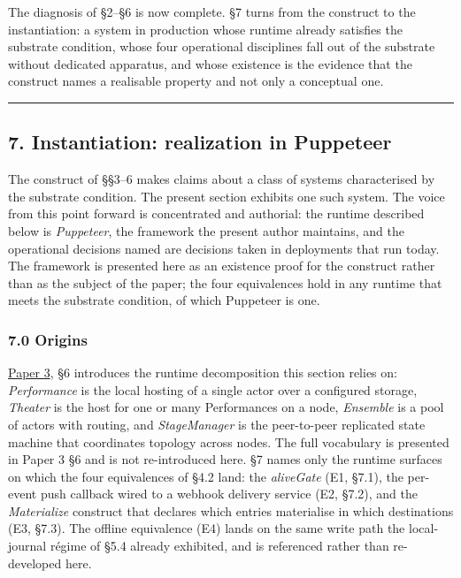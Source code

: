 \documentclass[
]{article}
\begin{document}
The diagnosis of §2--§6 is now complete. §7 turns from the construct to
the instantiation: a system in production whose runtime already
satisfies the substrate condition, whose four operational disciplines
fall out of the substrate without dedicated apparatus, and whose
existence is the evidence that the construct names a realisable property
and not only a conceptual one.

\begin{center}\rule{0.5\linewidth}{0.5pt}\end{center}

\subsection{7. Instantiation: realization in
Puppeteer}\label{instantiation-realization-in-puppeteer}

The construct of §§3--6 makes claims about a class of systems
characterised by the substrate condition. The present section exhibits
one such system. The voice from this point forward is concentrated and
authorial: the runtime described below is \emph{Puppeteer}, the
framework the present author maintains, and the operational decisions
named are decisions taken in deployments that run today. The framework
is presented here as an existence proof for the construct rather than as
the subject of the paper; the four equivalences hold in any runtime that
meets the substrate condition, of which Puppeteer is one.

\subsubsection{7.0 Origins}\label{origins}

\href{03-reactions-and-partition.md}{Paper 3}, §6 introduces the runtime
decomposition this section relies on: \emph{Performance} is the local
hosting of a single actor over a configured storage, \emph{Theater} is
the host for one or many Performances on a node, \emph{Ensemble} is a
pool of actors with routing, and \emph{StageManager} is the peer-to-peer
replicated state machine that coordinates topology across nodes. The
full vocabulary is presented in Paper 3 §6 and is not re-introduced
here. §7 names only the runtime surfaces on which the four equivalences
of §4.2 land: the \emph{aliveGate} (E1, §7.1), the per-event push
callback wired to a webhook delivery service (E2, §7.2), and the
\emph{Materialize} construct that declares which entries materialise in
which destinations (E3, §7.3). The offline equivalence (E4) lands on the
same write path the local-journal régime of §5.4 already exhibited, and
is referenced rather than re-developed here.
\end{document}
